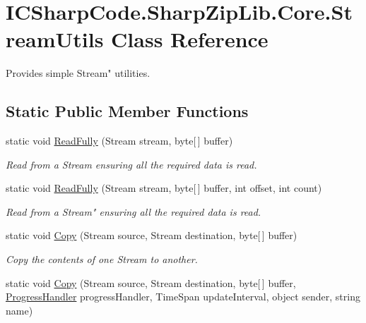 \hypertarget{class_i_c_sharp_code_1_1_sharp_zip_lib_1_1_core_1_1_stream_utils}{}\section{I\+C\+Sharp\+Code.\+Sharp\+Zip\+Lib.\+Core.\+Stream\+Utils Class Reference}
\label{class_i_c_sharp_code_1_1_sharp_zip_lib_1_1_core_1_1_stream_utils}


Provides simple Stream" utilities.  


\subsection*{Static Public Member Functions}
\begin{DoxyCompactItemize}
\item 
static void \hyperlink{class_i_c_sharp_code_1_1_sharp_zip_lib_1_1_core_1_1_stream_utils_a35593e4cff75ba440a12f5778cf96b87}{Read\+Fully} (Stream stream, byte\mbox{[}$\,$\mbox{]} buffer)
\begin{DoxyCompactList}\small\item\em Read from a Stream ensuring all the required data is read. \end{DoxyCompactList}\item 
static void \hyperlink{class_i_c_sharp_code_1_1_sharp_zip_lib_1_1_core_1_1_stream_utils_a310e2522c2517393a8a0bcb7b4e9f32f}{Read\+Fully} (Stream stream, byte\mbox{[}$\,$\mbox{]} buffer, int offset, int count)
\begin{DoxyCompactList}\small\item\em Read from a Stream" ensuring all the required data is read. \end{DoxyCompactList}\item 
static void \hyperlink{class_i_c_sharp_code_1_1_sharp_zip_lib_1_1_core_1_1_stream_utils_a4d28bd20f4b154a766948f7bb35e8788}{Copy} (Stream source, Stream destination, byte\mbox{[}$\,$\mbox{]} buffer)
\begin{DoxyCompactList}\small\item\em Copy the contents of one Stream to another. \end{DoxyCompactList}\item 
static void \hyperlink{class_i_c_sharp_code_1_1_sharp_zip_lib_1_1_core_1_1_stream_utils_a6d2302d10d2ef42d04aabddfcab286bc}{Copy} (Stream source, Stream destination, byte\mbox{[}$\,$\mbox{]} buffer, \hyperlink{namespace_i_c_sharp_code_1_1_sharp_zip_lib_1_1_core_a55f409bd1114da81c14d18c4d8682968}{Progress\+Handler} progress\+Handler, Time\+Span update\+Interval, object sender, string name)

\end{DoxyCompactItemize}
